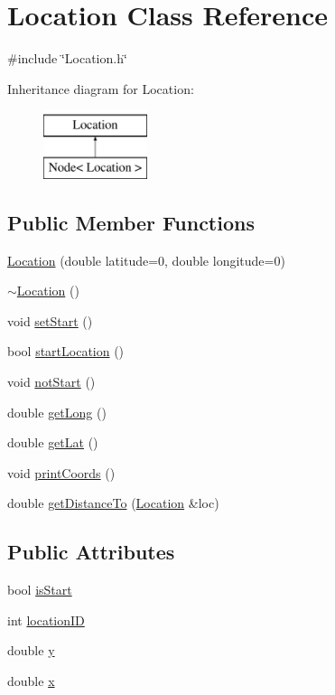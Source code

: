 \hypertarget{classLocation}{\section{Location Class Reference}
\label{classLocation}
}


{\ttfamily \#include \char`\"{}Location.\-h\char`\"{}}

Inheritance diagram for Location\-:\begin{figure}[H]
\begin{center}
\leavevmode
\includegraphics[height=2.000000cm]{classLocation}
\end{center}
\end{figure}
\subsection*{Public Member Functions}
\begin{DoxyCompactItemize}
\item 
\hyperlink{classLocation_a3fc215d3644f4ee28def0cc26dde9637}{Location} (double latitude=0, double longitude=0)
\item 
\hyperlink{classLocation_af5be2c6550bbd96137cbb3144ec3c529}{$\sim$\-Location} ()
\item 
void \hyperlink{classLocation_ae58d423830a2b73d26ee4f0eede072e5}{set\-Start} ()
\item 
bool \hyperlink{classLocation_a585a2e4471c314e177b130f29c0c008e}{start\-Location} ()
\item 
void \hyperlink{classLocation_a05b211d70840608bf0ae10e8981c2eb9}{not\-Start} ()
\item 
double \hyperlink{classLocation_a331ffb113757d06f959655627c96551c}{get\-Long} ()
\item 
double \hyperlink{classLocation_a2ec7b05afffdecadd2f030a3b5144d4c}{get\-Lat} ()
\item 
void \hyperlink{classLocation_afaee021c4f086843afc98f5f8a6883d8}{print\-Coords} ()
\item 
double \hyperlink{classLocation_a5160d825f9dbf4c24d73f87f037ee5a4}{get\-Distance\-To} (\hyperlink{classLocation}{Location} \&loc)
\end{DoxyCompactItemize}
\subsection*{Public Attributes}
\begin{DoxyCompactItemize}
\item 
bool \hyperlink{classLocation_a43b3f7f0d4884faec745edf2ccba621f}{is\-Start}
\item 
int \hyperlink{classLocation_a6be537a226b6add3dac2c3f9f87cdbb9}{location\-I\-D}
\item 
double \hyperlink{classLocation_a7981376ddbae36481fe6058146e1a130}{y}
\item 
double \hyperlink{classLocation_ac794205a47bb99febce79b4c6d614ec1}{x}
\end{DoxyCompactItemize}


